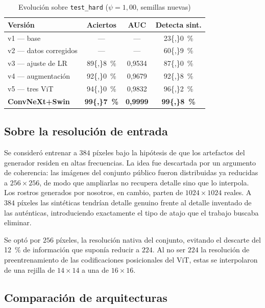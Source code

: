 \documentclass[10pt,twocolumn,letterpaper]{article}
\begin{document}
\begin{table}[t]
\caption{Evolución sobre \texttt{test\_hard} ($\psi=1{,}00$, semillas nuevas)}
\label{tab:evolucion}
\centering\small
\begin{tabular}{lccc}
\toprule
\textbf{Versión} & \textbf{Aciertos} & \textbf{AUC} & \textbf{Detecta sint.} \\
\midrule
v1 --- base            & ---   & ---     & \SI{23{,}0}{\percent} \\
v2 --- datos corregidos& ---   & ---     & \SI{60{,}9}{\percent} \\
v3 --- ajuste de LR    & \SI{89{,}8}{\percent} & 0,9534 & \SI{87{,}0}{\percent} \\
v4 --- augmentación    & \SI{92{,}0}{\percent} & 0,9679 & \SI{92{,}8}{\percent} \\
v5 --- tres ViT        & \SI{94{,}0}{\percent} & 0,9832 & \SI{96{,}2}{\percent} \\
\textbf{ConvNeXt+Swin} & \textbf{\SI{99{,}7}{\percent}} & \textbf{0,9999}
                       & \textbf{\SI{99{,}8}{\percent}} \\
\bottomrule
\end{tabular}
\end{table}

\subsection{Sobre la resolución de entrada}
\label{sec:resolucion}

Se consideró entrenar a $384$ píxeles bajo la hipótesis de que los
artefactos del generador residen en altas frecuencias. La idea fue
descartada por un argumento de coherencia: las imágenes del conjunto
público fueron distribuidas ya reducidas a $256\times256$, de modo que
ampliarlas no recupera detalle sino que lo interpola. Los rostros generados
por nosotros, en cambio, parten de $1024\times1024$ reales. A $384$ píxeles
las sintéticas tendrían detalle genuino frente al detalle inventado de las
auténticas, introduciendo exactamente el tipo de atajo que el trabajo buscaba
eliminar.

Se optó por $256$ píxeles, la resolución nativa del conjunto, evitando el
descarte del \SI{12}{\percent} de información que suponía reducir a $224$.
Al no ser $224$ la resolución de preentrenamiento de las codificaciones
posicionales del ViT, estas se interpolaron de una rejilla de $14\times14$ a
una de $16\times16$.

\subsection{Comparación de arquitecturas}
\label{sec:arquitecturas}
\end{document}
